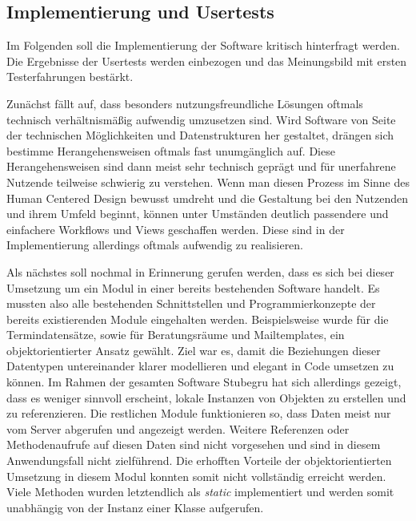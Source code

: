 \subsection*{Implementierung und Usertests}

Im Folgenden soll die Implementierung der Software kritisch
hinterfragt werden. Die Ergebnisse der Usertests werden einbezogen und das Meinungsbild mit ersten Testerfahrungen bestärkt.

Zunächst fällt auf, dass besonders nutzungsfreundliche Lösungen
oftmals technisch verhältnismäßig aufwendig umzusetzen sind. Wird Software von
Seite der technischen Möglichkeiten und Datenstrukturen her gestaltet, drängen
sich bestimme Herangehensweisen oftmals fast unumgänglich auf. Diese
Herangehensweisen sind dann meist sehr technisch geprägt und für unerfahrene
Nutzende teilweise schwierig zu verstehen. Wenn man diesen Prozess im Sinne des
Human Centered Design bewusst umdreht und die Gestaltung bei den Nutzenden und
ihrem Umfeld beginnt, können unter Umständen deutlich passendere und einfachere
Workflows und Views geschaffen werden. Diese sind in der Implementierung
allerdings oftmals aufwendig zu realisieren.

Als nächstes soll nochmal in Erinnerung gerufen werden, dass es sich bei dieser
Umsetzung um ein Modul in einer bereits bestehenden Software handelt. Es
mussten also alle bestehenden Schnittstellen und Programmierkonzepte der
bereits existierenden Module eingehalten werden. Beispielsweise wurde für die
Termindatensätze, sowie für Beratungsräume und Mailtemplates, ein
objektorientierter Ansatz gewählt. Ziel war es, damit die Beziehungen dieser
Datentypen untereinander klarer modellieren und elegant in Code umsetzen zu
können. Im Rahmen der gesamten Software Stubegru hat sich allerdings gezeigt,
dass es weniger sinnvoll erscheint, lokale Instanzen von Objekten zu erstellen und zu
referenzieren. Die restlichen Module funktionieren so, dass Daten meist nur vom
Server abgerufen und angezeigt werden. Weitere Referenzen oder Methodenaufrufe
auf diesen Daten sind nicht vorgesehen und sind in diesem Anwendungsfall nicht zielführend. Die erhofften Vorteile der objektorientierten Umsetzung in diesem
Modul konnten somit nicht vollständig erreicht werden. Viele Methoden wurden
letztendlich als \textit{static} implementiert und werden somit unabhängig von
der Instanz einer Klasse aufgerufen.

